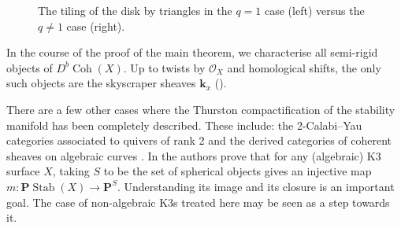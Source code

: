 \documentclass{amsart}
\begin{document}
  \begin{figure}[ht]
    \centering
    \caption{The tiling of the disk by triangles in the \(q = 1\) case (left) versus the \(q \neq 1\) case (right).}
    \label{fig:upper-half-plane}
  \end{figure}
  
  
In the course of the proof of the main theorem, we characterise all semi-rigid objects of \(D^b \operatorname{Coh} (X)\).
Up to twists by \(\mathcal{O}_X\) and homological shifts, the only such objects are the skyscraper sheaves \(\mathbf{k}_x\) ().

There are a few other cases where the Thurston compactification of the stability manifold has been completely described.
These include: the 2-Calabi--Yau categories associated to quivers of rank 2 \cite{bap.deo.lic:20} and the derived categories of coherent sheaves on algebraic curves \cite{kik.kos.ouc:24}.
In \cite{kik.kos.ouc:25} the authors prove that for any (algebraic) K3 surface \(X\), taking \(S\) to be the set of spherical objects gives an injective map \(m \colon \mathbf{P} \operatorname{Stab}(X) \to \mathbf{P}^S\).
Understanding its image and its closure is an important goal.
The case of non-algebraic K3s treated here may be seen as a step towards it.
\end{document}
